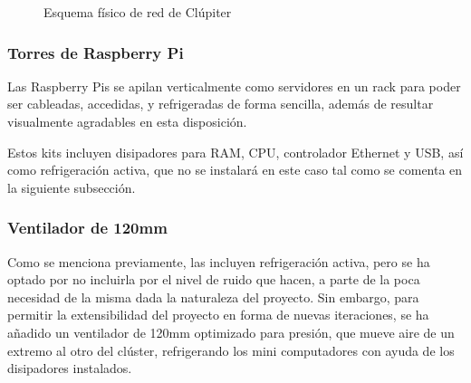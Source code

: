 \begin{figure}[h!]
  \centering
  \def\svgwidth{\textwidth}
  
  \caption{Esquema físico de red de Clúpiter}
  \label{fig:raspi_diagram_eth}
\end{figure}

\subsubsection{Torres de Raspberry Pi}
\label{sssec:torresrpi}
Las Raspberry Pis se apilan verticalmente como servidores en un rack para poder ser cableadas, accedidas, y refrigeradas de forma sencilla, además de resultar visualmente agradables en esta disposición.

Estos kits incluyen disipadores para RAM, CPU, controlador Ethernet y USB, así como refrigeración activa, que no se instalará en este caso tal como se comenta en la siguiente subsección.




\subsubsection{Ventilador de 120mm}
Como se menciona previamente, las  incluyen refrigeración activa, pero se ha optado por no incluirla por el nivel de ruido que hacen, a parte de la poca necesidad de la misma dada la naturaleza del proyecto. Sin embargo, para permitir la extensibilidad del proyecto en forma de nuevas iteraciones, se ha añadido un ventilador de 120mm optimizado para presión, que mueve aire de un extremo al otro del clúster, refrigerando los mini computadores con ayuda de los disipadores instalados.

